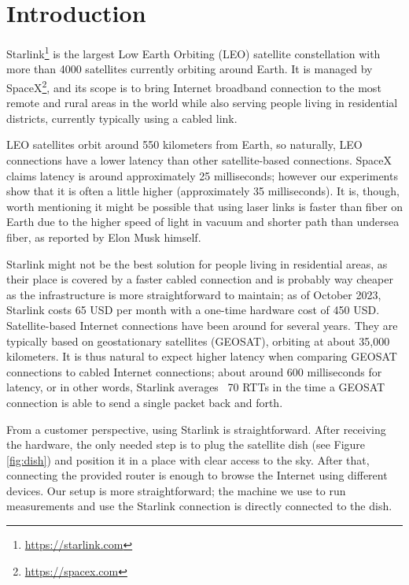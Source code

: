 \documentclass[IN,11pt,twoside,openright,idp,english]{tumthesis}
\begin{document}
\section{Introduction}
    
Starlink\footnote{\url{https://starlink.com}} is the largest Low Earth Orbiting (LEO) satellite constellation with more than 4000 satellites currently orbiting around Earth. It is managed by SpaceX\footnote{\url{https://spacex.com}}, and its scope is to bring Internet broadband connection to the most remote and rural areas in the world while also serving people living in residential districts, currently typically using a cabled link.
    
LEO satellites orbit around 550 kilometers from Earth, so naturally, LEO connections have a lower latency than other satellite-based connections. SpaceX claims latency is around approximately 25 milliseconds; however our experiments show that it is often a little higher (approximately 35 milliseconds). It is, though, worth mentioning it might be possible that using laser links is faster than fiber on Earth due to the higher speed of light in vacuum and shorter path than undersea fiber, as reported by Elon Musk himself\cite{tweet}.

Starlink might not be the best solution for people living in residential areas, as their place is covered by a faster cabled connection and is probably way cheaper as the infrastructure is more straightforward to maintain; as of October 2023, Starlink costs 65 USD per month with a one-time hardware cost of 450 USD. 
Satellite-based Internet connections have been around for several years. They are typically based on geostationary satellites (GEOSAT), orbiting at about 35,000 kilometers. It is thus natural to expect higher latency when comparing GEOSAT connections to cabled Internet connections; about around 600 milliseconds for latency, or in other words, Starlink averages ~70 RTTs in the time a GEOSAT connection is able to send a single packet back and forth.
    
From a customer perspective, using Starlink is straightforward. After receiving the hardware, the only needed step is to plug the satellite dish (see Figure \ref{fig:dish}) and position it in a place with clear access to the sky. After that, connecting the provided router is enough to browse the Internet using different devices. Our setup is more straightforward; the machine we use to run measurements and use the Starlink connection is directly connected to the dish.
    
\end{document}

